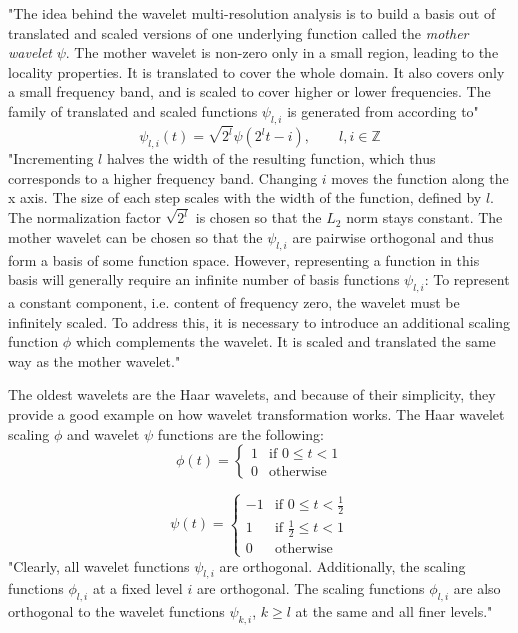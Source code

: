       "The idea behind the wavelet multi-resolution analysis is to build a basis out of translated and scaled versions of one underlying function called the \textit{mother wavelet} $\psi$. The mother wavelet is non-zero only in a small region, leading to the locality properties. It is translated to cover the whole domain. It also covers only a small frequency band, and is scaled to cover higher or lower frequencies. The family of translated and scaled functions $\psi_{l,i}$ is generated from   according to"
      \begin{equation}
        \psi_{l,i}(t) = \sqrt{2^l} \psi \left(2^l t-i\right), \qquad l, i \in \mathbb{Z}
      \end{equation}
      "Incrementing $l$ halves the width of the resulting function, which thus corresponds to a higher frequency band. Changing $i$ moves the function along the x axis. The size of each step scales with the width of the function, defined by $l$. The normalization factor $\sqrt{2^l}$ is chosen so that the $L_2$ norm stays constant. The mother wavelet can be chosen so that the $\psi_{l,i}$ are pairwise orthogonal and thus form a basis of some function space. However, representing a function in this basis will generally require an infinite number of basis functions $\psi_{l,i}$: To represent a constant component, i.e. content of frequency zero, the wavelet must be infinitely scaled. To address this, it is necessary to introduce an additional scaling function $\phi$ which complements the wavelet. It is scaled and translated the same way as the mother wavelet."

      The oldest wavelets are the Haar wavelets, and because of their simplicity, they provide a good example on how wavelet transformation works. The Haar wavelet scaling $\phi$ and wavelet $\psi$ functions are the following:
      \begin{equation}
        \phi(t) = 
        \begin{cases}
          1 & \text{if } 0 \leq t < 1 \\
          0 & \text{otherwise}
        \end{cases}
        \label{eq:scaling}
      \end{equation}

      \begin{equation}
        \psi(t) = 
        \begin{cases}
          -1 & \text{if } 0 \leq t < \frac{1}{2} \\
          1 & \text{if } \frac{1}{2} \leq t < 1 \\
          0 & \text{otherwise}
        \end{cases}
        \label{eq:wavelet}
      \end{equation}
      "Clearly, all wavelet functions $\psi_{l,i}$ are orthogonal. Additionally, the scaling functions $\phi_{l,i}$ at a fixed level $i$ are orthogonal. The scaling functions $\phi_{l,i}$ are also orthogonal to the wavelet functions $\psi_{k,i}$, $k \geq l$ at the same and all finer levels."

